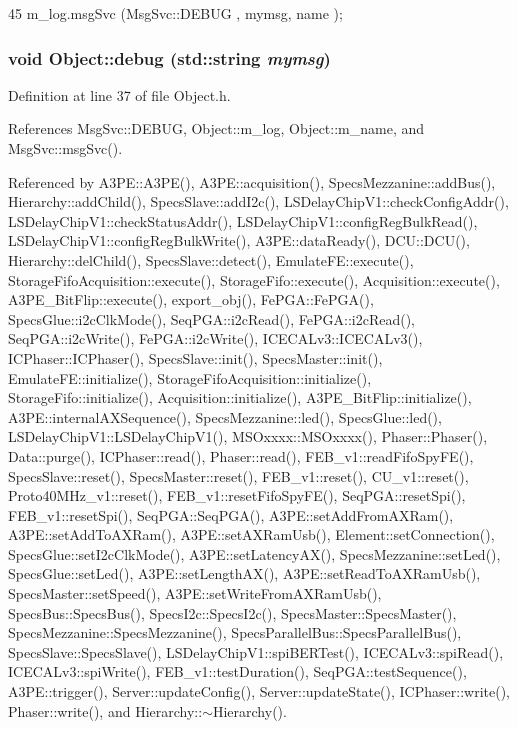 \begin{DoxyCode}
45 { m_log.msgSvc (MsgSvc::DEBUG   , mymsg, name ); }
\end{DoxyCode}
\hypertarget{classObject_aac010553f022165573714b7014a15f0d}{
\subsubsection[{debug}]{\setlength{\rightskip}{0pt plus 5cm}void Object::debug (std::string {\em mymsg})}}
\label{classObject_aac010553f022165573714b7014a15f0d}


Definition at line 37 of file Object.h.

References MsgSvc::DEBUG, Object::m\_\-log, Object::m\_\-name, and MsgSvc::msgSvc().

Referenced by A3PE::A3PE(), A3PE::acquisition(), SpecsMezzanine::addBus(), Hierarchy::addChild(), SpecsSlave::addI2c(), LSDelayChipV1::checkConfigAddr(), LSDelayChipV1::checkStatusAddr(), LSDelayChipV1::configRegBulkRead(), LSDelayChipV1::configRegBulkWrite(), A3PE::dataReady(), DCU::DCU(), Hierarchy::delChild(), SpecsSlave::detect(), EmulateFE::execute(), StorageFifoAcquisition::execute(), StorageFifo::execute(), Acquisition::execute(), A3PE\_\-BitFlip::execute(), export\_\-obj(), FePGA::FePGA(), SpecsGlue::i2cClkMode(), SeqPGA::i2cRead(), FePGA::i2cRead(), SeqPGA::i2cWrite(), FePGA::i2cWrite(), ICECALv3::ICECALv3(), ICPhaser::ICPhaser(), SpecsSlave::init(), SpecsMaster::init(), EmulateFE::initialize(), StorageFifoAcquisition::initialize(), StorageFifo::initialize(), Acquisition::initialize(), A3PE\_\-BitFlip::initialize(), A3PE::internalAXSequence(), SpecsMezzanine::led(), SpecsGlue::led(), LSDelayChipV1::LSDelayChipV1(), MSOxxxx::MSOxxxx(), Phaser::Phaser(), Data::purge(), ICPhaser::read(), Phaser::read(), FEB\_\-v1::readFifoSpyFE(), SpecsSlave::reset(), SpecsMaster::reset(), FEB\_\-v1::reset(), CU\_\-v1::reset(), Proto40MHz\_\-v1::reset(), FEB\_\-v1::resetFifoSpyFE(), SeqPGA::resetSpi(), FEB\_\-v1::resetSpi(), SeqPGA::SeqPGA(), A3PE::setAddFromAXRam(), A3PE::setAddToAXRam(), A3PE::setAXRamUsb(), Element::setConnection(), SpecsGlue::setI2cClkMode(), A3PE::setLatencyAX(), SpecsMezzanine::setLed(), SpecsGlue::setLed(), A3PE::setLengthAX(), A3PE::setReadToAXRamUsb(), SpecsMaster::setSpeed(), A3PE::setWriteFromAXRamUsb(), SpecsBus::SpecsBus(), SpecsI2c::SpecsI2c(), SpecsMaster::SpecsMaster(), SpecsMezzanine::SpecsMezzanine(), SpecsParallelBus::SpecsParallelBus(), SpecsSlave::SpecsSlave(), LSDelayChipV1::spiBERTest(), ICECALv3::spiRead(), ICECALv3::spiWrite(), FEB\_\-v1::testDuration(), SeqPGA::testSequence(), A3PE::trigger(), Server::updateConfig(), Server::updateState(), ICPhaser::write(), Phaser::write(), and Hierarchy::$\sim$Hierarchy().


